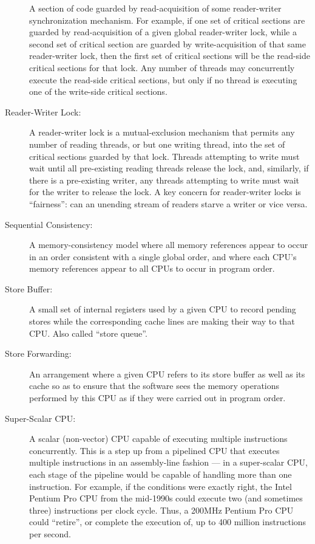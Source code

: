 \begin{description}
	A section of code guarded by read-acquisition of
	some reader-writer synchronization mechanism.
	For example, if one set of critical sections are guarded by
	read-acquisition of
	a given global reader-writer lock, while a second set of critical
	section are guarded by write-acquisition of that same reader-writer
	lock, then the first set of critical sections will be the
	read-side critical sections for that lock.
	Any number of threads may concurrently execute the read-side
	critical sections, but only if no thread is executing one of
	the write-side critical sections.
\item[Reader-Writer Lock:]
	A reader-writer lock is a mutual-exclusion mechanism that
	permits any number of reading
	threads, or but one writing thread, into the set of critical
	sections guarded by that lock.
	Threads attempting to write must wait until all pre-existing
	reading threads release the lock, and, similarly, if there
	is a pre-existing writer, any threads attempting to write must
	wait for the writer to release the lock.
	A key concern for reader-writer locks is ``fairness'':
	can an unending stream of readers starve a writer or vice versa.
\item[Sequential Consistency:]
	A memory-consistency model where all memory references appear to occur
	in an order consistent with
	a single global order, and where each CPU's memory references
	appear to all CPUs to occur in program order.
\item[Store Buffer:]
	A small set of internal registers used by a given CPU
	to record pending stores
	while the corresponding cache lines are making their
	way to that CPU.
	Also called ``store queue''.
\item[Store Forwarding:]
	An arrangement where a given CPU refers to its store buffer
	as well as its cache so as to ensure that the software sees
	the memory operations performed by this CPU as if they
	were carried out in program order.
\item[Super-Scalar CPU:]
	A scalar (non-vector) CPU capable of executing multiple instructions
	concurrently.
	This is a step up from a pipelined CPU that executes multiple
	instructions in an assembly-line fashion --- in a super-scalar
	CPU, each stage of the pipeline would be capable of handling
	more than one instruction.
	For example, if the conditions were exactly right,
	the Intel Pentium Pro CPU from the mid-1990s could
	execute two (and sometimes three) instructions per clock cycle.
	Thus, a 200MHz Pentium Pro CPU could ``retire'', or complete the
	execution of, up to 400 million instructions per second.

\end{description}
